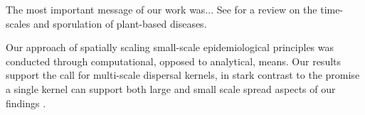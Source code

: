 The most important message of our work was...
See \cite{ferrandino2012time} for a review on the time-scales and sporulation of plant-based diseases.

Our approach of spatially scaling small-scale epidemiological principles was conducted through computational, opposed to analytical, means. 
Our results support the call for multi-scale dispersal kernels, in stark contrast to the promise a single kernel can support both large and small scale spread \cite{https://doi.org/10.1111/jbi.13642} %
aspects of our findings . 


